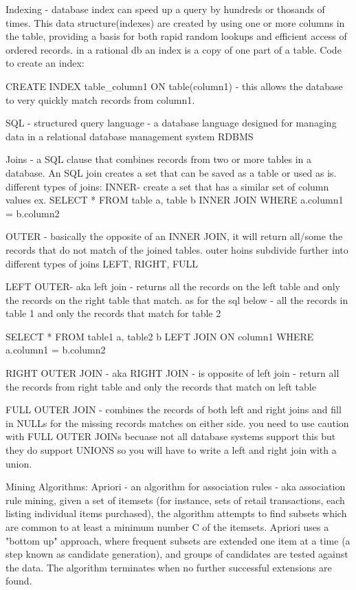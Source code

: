 Indexing - database index can speed up a query by hundreds or thosands of times. This data structure(indexes) are created by using one or more columns in the table, providing a 
basis for both rapid random lookups and efficient access of ordered records. in a rational db an index is a copy of one part of a table. Code to create an index: 

CREATE INDEX table_column1 ON table(column1) - this allows the database to very quickly match records from column1. 

SQL - structured query language - a database language designed for managing data in a relational database management system RDBMS 

Joins - a SQL clause that combines records from two or more tables in a database. An SQL join creates a set that can be saved as a table or used as is. 
different types of joins: 
INNER- create a set that has a similar set of column values 
ex. SELECT * FROM table a, table b INNER JOIN 
WHERE a.column1 = b.column2 

OUTER - basically the opposite of an INNER JOIN, it will return all/some the records that do not match of the joined tables. outer hoins subdivide further into different types of 
joins LEFT, RIGHT, FULL 

LEFT OUTER- aka left join - returns all the records on the left table and only the records on the right table that match. as for the sql below - all the records in table 1 and 
only the records that match for table 2 

SELECT * FROM table1 a, table2 b LEFT JOIN ON column1 
WHERE a.column1 = b.column2 

RIGHT OUTER JOIN - aka RIGHT JOIN - is opposite of left join - return all the records from right table and only the records that match on left table 


FULL OUTER JOIN - combines the records of both left and right joins and fill in NULLs for the missing records matches on either side. you need to use caution with FULL OUTER JOINs 
becuase not all database systems support this but they do support UNIONS so you will have to write a left and right join with a union. 

Mining Algorithms: 
Apriori - an algorithm for association rules - aka association rule mining, given a set of itemsets (for instance, sets of retail transactions, each listing individual items 
purchased), the algorithm attempts to find subsets which are common to at least a minimum number C of the itemsets. Apriori uses a "bottom up" approach, where frequent subsets are 
extended one item at a time (a step known as candidate generation), and groups of candidates are tested against the data. The algorithm terminates when no further successful 
extensions are found.

